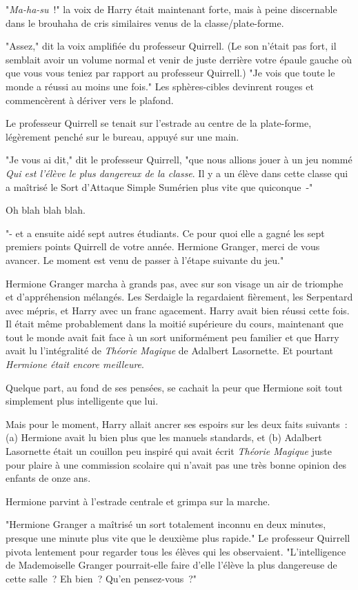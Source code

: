 "\emph{Ma-ha-su}~!" la voix de Harry était maintenant forte, mais à peine discernable dans le brouhaha de cris similaires venus de la classe/plate-forme.

"Assez," dit la voix amplifiée du professeur Quirrell. (Le son n'était pas fort, il semblait avoir un volume normal et venir de juste derrière votre épaule gauche où que vous vous teniez par rapport au professeur Quirrell.) "Je vois que toute le monde a réussi au moins une fois." Les sphères-cibles devinrent rouges et commencèrent à dériver vers le plafond.

Le professeur Quirrell se tenait sur l'estrade au centre de la plate-forme, légèrement penché sur le bureau, appuyé sur une main.

"Je vous ai dit," dit le professeur Quirrell, "que nous allions jouer à un jeu nommé \emph{Qui est l'élève le plus dangereux de la classe}. Il y a un élève dans cette classe qui a maîtrisé le Sort d'Attaque Simple Sumérien plus vite que quiconque~-"

Oh blah blah blah.

"- et a ensuite aidé sept autres étudiants. Ce pour quoi elle a gagné les sept premiers points Quirrell de votre année. Hermione Granger, merci de vous avancer. Le moment est venu de passer à l'étape suivante du jeu."

Hermione Granger marcha à grands pas, avec sur son visage un air de triomphe et d'appréhension mélangés. Les Serdaigle la regardaient fièrement, les Serpentard avec mépris, et Harry avec un franc agacement. Harry avait bien réussi cette fois. Il était même probablement dans la moitié supérieure du cours, maintenant que tout le monde avait fait face à un sort uniformément peu familier et que Harry avait lu l'intégralité de \emph{Théorie Magique} de Adalbert Lasornette. Et pourtant \emph{Hermione était encore meilleure}.

Quelque part, au fond de ses pensées, se cachait la peur que Hermione soit tout simplement plus intelligente que lui.

Mais pour le moment, Harry allait ancrer ses espoirs sur les deux faits suivants~: (a) Hermione avait lu bien plus que les manuels standards, et (b) Adalbert Lasornette était un couillon peu inspiré qui avait écrit \emph{Théorie Magique} juste pour plaire à une commission scolaire qui n'avait pas une très bonne opinion des enfants de onze ans.

Hermione parvint à l'estrade centrale et grimpa sur la marche.

"Hermione Granger a maîtrisé un sort totalement inconnu en deux minutes, presque une minute plus vite que le deuxième plus rapide." Le professeur Quirrell pivota lentement pour regarder tous les élèves qui les observaient. "L'intelligence de Mademoiselle Granger pourrait-elle faire d'elle l'élève la plus dangereuse de cette salle~? Eh bien~? Qu'en pensez-vous~?"

